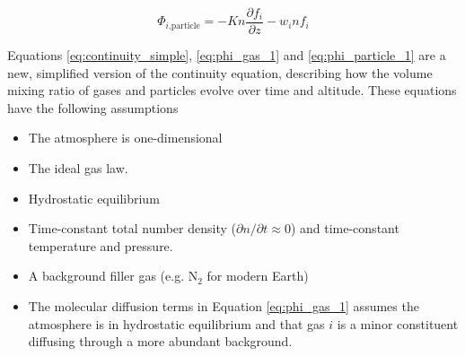 \documentclass{article}
\begin{document}
\begin{equation} \label{eq:phi_particle_1}
  \Phi_{i\text{,particle}} = - Kn\frac{\partial f_{i}}{\partial z} - w_i n f_{i}
\end{equation}

Equations \eqref{eq:continuity_simple}, \eqref{eq:phi_gas_1} and \eqref{eq:phi_particle_1} are a new, simplified version of the continuity equation, describing how the volume mixing ratio of gases and particles evolve over time and altitude. These equations have the following assumptions
\begin{itemize}
  \item The atmosphere is one-dimensional
  \item The ideal gas law.
  \item Hydrostatic equilibrium
  \item Time-constant total number density ($\partial n / \partial t \approx 0$) and time-constant temperature and pressure.
  \item A background filler gas (e.g. N$_2$ for modern Earth)
  \item The molecular diffusion terms in Equation \eqref{eq:phi_gas_1} assumes the atmosphere is in hydrostatic equilibrium and that gas $i$ is a minor constituent diffusing through a more abundant background.
\end{itemize}


\end{document}
